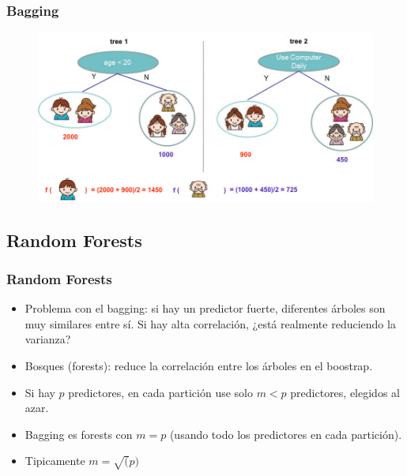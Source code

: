 \documentclass[
  shownotes,
  xcolor={svgnames},
  hyperref={colorlinks,citecolor=DarkBlue,linkcolor=andesred,urlcolor=DarkBlue}
  , aspectratio=169]{beamer}
\begin{document}
\begin{frame}[fragile]
\frametitle{Bagging}



\begin{figure}[H] \centering
            \captionsetup{justification=centering}
              \includegraphics[scale=0.4]{figures/twocart_gboost.jpeg}
 \end{figure}

\end{frame}
\subsection{Random Forests }
\begin{frame}[fragile]
\frametitle{Random Forests}

\begin{itemize}
  \item Problema con el bagging: si hay un predictor fuerte, diferentes árboles son muy similares entre sí. Si hay alta correlación, ¿está realmente reduciendo la varianza?
\bigskip
\item Bosques (forests): reduce la correlación entre los árboles  en el boostrap.
\bigskip
\item Si hay $p$ predictores, en cada partición use solo  $m <p$ predictores, elegidos al azar.
\bigskip
\item Bagging es forests con $m = p$ (usando todo los predictores en cada partición).
\bigskip
\item Tipicamente $m = \sqrt(p)$
\end{itemize}

\end{frame}
\end{document}
